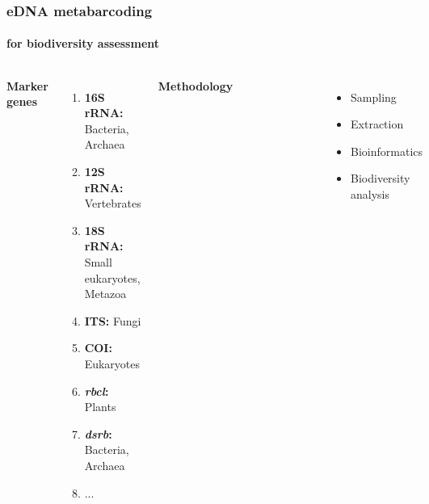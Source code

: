 \documentclass{beamer}
\begin{document}
   \begin{frame}
      
      \frametitle{eDNA metabarcoding}
      \framesubtitle{for biodiversity assessment}
      \begin{singlespace}


         \begin{columns}[onlytextwidth]


               \textbf{Marker genes} \\ 

               \begin{enumerate}
                  \item \textbf{16S rRNA:} Bacteria, Archaea
                  \item \textbf{12S rRNA:} Vertebrates
                  \item \textbf{18S rRNA:} Small eukaryotes, Metazoa
                  \item \textbf{ITS:} Fungi
                  \item \textbf{COI:} Eukaryotes
                  \item \textbf{\textit{rbcl}:} Plants
                  \item \textbf{\textit{dsrb}:} Bacteria, Archaea
                  \item ...
               \end{enumerate}


               \textbf{Methodology}

               \begin{figure}
                  \includegraphics[width=55mm]{resources/metabarcoding-steps.png}
               \end{figure}

               \begin{itemize}
                  \item Sampling
                  \item Extraction
                  \item Bioinformatics
                  \item Biodiversity analysis
               \end{itemize}
               


\end{columns}
\end{singlespace}
\end{frame}
\end{document}
